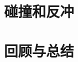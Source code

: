 \documentclass[color=purple,openany]{textbook-cn}
\begin{document}
\begin{Point}
\lipsum[2]
\end{Point}

\begin{Case}
\item \lipsum[1][3]
\item \lipsum[1][3]
\item \lipsum[1][3]
\item \lipsum[1][3]
\end{Case}

\begin{Link}
\zhlipsum[1]
\end{Link}




\section{碰撞和反冲}

\begin{Point}
\lipsum[2]
\end{Point}

\begin{Case}
\item \lipsum[1][3]
\item \lipsum[1][3]
\item \lipsum[1][3]
\item \lipsum[1][3]
\end{Case}

\begin{Link}
\zhlipsum[1]
\end{Link}



\section{回顾与总结}

\begin{Point}
\lipsum[2]
\end{Point}

\begin{Case*}
\item \lipsum[1][3]
\item \lipsum[1][3]
\item \lipsum[1][3]
\item \lipsum[1][3]
\end{Case*}

\begin{Link}
\zhlipsum[1]
\end{Link}
\end{document}
